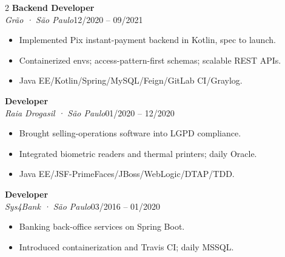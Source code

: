 \documentclass[10pt,a4paper]{article}
\newcommand{\role}[3]{\textbf{#1}\\\textit{\color{muted}#2}\hfill\footnotesize\color{muted}#3\par}
\begin{document}
\begin{paracol}{2}
\role{Backend Developer}{Grão · São Paulo}{12/2020 -- 09/2021}
\begin{itemize}
\item Implemented Pix instant-payment backend in Kotlin, spec to launch.
\item Containerized envs; access-pattern-first schemas; scalable REST APIs.
\item Java EE/Kotlin/Spring/MySQL/Feign/GitLab CI/Graylog.
\end{itemize}
\medskip

\role{Developer}{Raia Drogasil · São Paulo}{01/2020 -- 12/2020}
\begin{itemize}
\item Brought selling-operations software into LGPD compliance.
\item Integrated biometric readers and thermal printers; daily Oracle.
\item Java EE/JSF-PrimeFaces/JBoss/WebLogic/DTAP/TDD.
\end{itemize}
\medskip

\role{Developer}{Sys4Bank · São Paulo}{03/2016 -- 01/2020}
\begin{itemize}
\item Banking back-office services on Spring Boot.
\item Introduced containerization and Travis CI; daily MSSQL.
\end{itemize}

\end{paracol}
\end{document}
